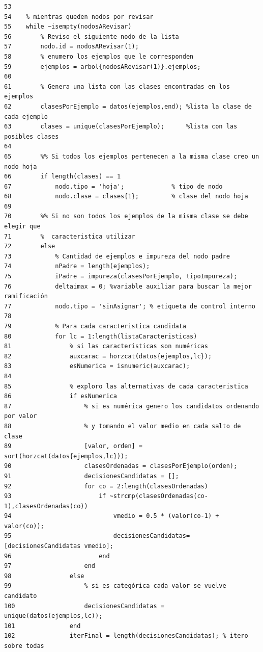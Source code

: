 \documentclass[11pt,a4paper,final]{article}
\begin{document}
\begin{verbatim}
53    
54    % mientras queden nodos por revisar
55    while ~isempty(nodosARevisar)
56        % Reviso el siguiente nodo de la lista
57        nodo.id = nodosARevisar(1);
58        % enumero los ejemplos que le corresponden 
59        ejemplos = arbol{nodosARevisar(1)}.ejemplos;
60        
61        % Genera una lista con las clases encontradas en los ejemplos
62        clasesPorEjemplo = datos(ejemplos,end); %lista la clase de cada ejemplo
63        clases = unique(clasesPorEjemplo);      %lista con las posibles clases
64    
65        %% Si todos los ejemplos pertenecen a la misma clase creo un nodo hoja
66        if length(clases) == 1
67            nodo.tipo = 'hoja';             % tipo de nodo
68            nodo.clase = clases{1};         % clase del nodo hoja
69    
70        %% Si no son todos los ejemplos de la misma clase se debe elegir que 
71        %  caracteristica utilizar
72        else
73            % Cantidad de ejemplos e impureza del nodo padre
74            nPadre = length(ejemplos);                 
75            iPadre = impureza(clasesPorEjemplo, tipoImpureza); 
76            deltaimax = 0; %variable auxiliar para buscar la mejor ramificación
77            nodo.tipo = 'sinAsignar'; % etiqueta de control interno
78            
79            % Para cada caracteristica candidata
80            for lc = 1:length(listaCaracteristicas)
81                % si las caracteristicas son numéricas
82                auxcarac = horzcat(datos{ejemplos,lc});
83                esNumerica = isnumeric(auxcarac);
84                
85                % exploro las alternativas de cada caracteristica
86                if esNumerica
87                    % si es numérica genero los candidatos ordenando por valor
88                    % y tomando el valor medio en cada salto de clase
89                    [valor, orden] = sort(horzcat(datos{ejemplos,lc}));
90                    clasesOrdenadas = clasesPorEjemplo(orden);
91                    decisionesCandidatas = [];
92                    for co = 2:length(clasesOrdenadas)
93                        if ~strcmp(clasesOrdenadas(co-1),clasesOrdenadas(co))
94                            vmedio = 0.5 * (valor(co-1) + valor(co));
95                            decisionesCandidatas=[decisionesCandidatas vmedio];
96                        end
97                    end
98                else
99                    % si es categórica cada valor se vuelve candidato
100                   decisionesCandidatas = unique(datos(ejemplos,lc));
101               end
102               iterFinal = length(decisionesCandidatas); % itero sobre todas 

\end{verbatim}
\end{document}
